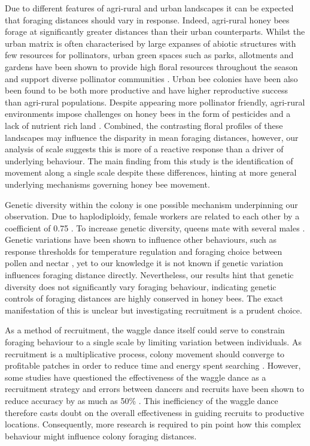 \documentclass[11pt,usenames,dvipsnames,a4paper]{article}
\begin{document}
\begin{linenumbers}
Due to different features of agri-rural and urban landscapes it can be expected that foraging distances should vary in response. Indeed, agri-rural honey bees forage at significantly greater distances than their urban counterparts. Whilst the urban matrix is often characterised by large expanses of abiotic structures with few resources for pollinators, urban green spaces such as parks, allotments and gardens have been shown to provide high floral resources throughout the season \citep{Baldock2015, Baldock2019, Plascencia2017} and support diverse pollinator communities \citep{Hall2017}. Urban bee colonies have been also been found to be both more productive \citep{Lecocq2015} and have higher reproductive success \citep{Samuelson2018} than agri-rural populations. Despite appearing more pollinator friendly, agri-rural environments impose challenges on honey bees in the form of pesticides \citep{Wood2017} and a lack of nutrient rich land \citep{Carvell2006}. Combined, the contrasting floral profiles of these landscapes may influence the disparity in mean foraging distances, however, our analysis of scale suggests this is more of a reactive response than a driver of underlying behaviour. The main finding from this study is the identification of movement along a single scale despite these differences, hinting at more general underlying mechanisms governing honey bee movement.

Genetic diversity within the colony is one possible mechanism underpinning our observation. Due to haplodiploidy, female workers are related to each other by a coefficient of 0.75 \citep{Ratnieks1989}. To increase genetic diversity, queens mate with several males \citep{Jones2004}. Genetic variations have been shown to influence other behaviours, such as response thresholds for temperature regulation \citep{Jones2004} and foraging choice between pollen and nectar \citep{Fewell1993, Fewell2000}, yet to our knowledge it is not known if genetic variation influences foraging distance directly. Nevertheless, our results hint that genetic diversity does not significantly vary foraging behaviour, indicating genetic controls of foraging distances are highly conserved in honey bees. The exact manifestation of this is unclear but investigating recruitment is a prudent choice.

As a method of recruitment, the waggle dance itself could serve to constrain foraging behaviour to a single scale by limiting variation between individuals. As recruitment is a multiplicative process, colony movement should converge to profitable patches in order to reduce time and energy spent searching \citep{Seeley1995}. However, some studies have questioned the effectiveness of the waggle dance as a recruitment strategy \citep{Sherman2002, Dornhaus2004, Gruter2008, Gruter2009, Schurch2013} and errors between dancers and recruits have been shown to reduce accuracy by as much as 50\% \citep{Schurch2013}. This inefficiency of the waggle dance therefore casts doubt on the overall effectiveness in guiding recruits to productive locations. Consequently, more research is required to pin point how this complex behaviour might influence colony foraging distances.


\end{linenumbers}
\end{document}
